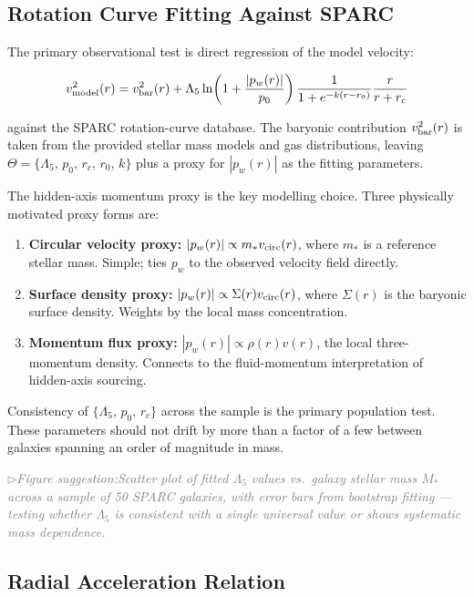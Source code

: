 \documentclass[11pt,a4paper]{article}
\newcommand{\pw}{p_w}                        %
\newcommand{\Lf}{\Lambda_5}                  %
\newcommand{\vbar}{v_{\rm bar}}              %
\newcommand{\vmod}{v_{\rm model}}            %
\newcommand{\figsuggest}[1]{%
  \medskip
  \noindent\hspace{0pt}\textcolor{gray}{\small\itshape
    $\triangleright$\;Figure suggestion:\enspace #1}%
  \medskip}
\begin{document}
\subsection{Rotation Curve Fitting Against SPARC}\label{sec:sparc}

The primary observational test is direct regression of the model velocity:

\[
  \vmod^2(r) = \vbar^2(r) + \Lf\ln\!\left(1+\frac{|\pw(r)|}{p_0}\right)
  \frac{1}{1+e^{-k(r-r_0)}} \frac{r}{r+r_c}
\]

against the SPARC rotation-curve database.  The baryonic contribution
$\vbar^2(r)$ is taken from the provided stellar mass models and gas
distributions, leaving $\Theta = \{\Lf,\,p_0,\,r_c,\,r_0,\,k\}$ plus a
proxy for $|\pw(r)|$ as the fitting parameters.

The hidden-axis momentum proxy is the key modelling choice.  Three
physically motivated proxy forms are:

\begin{enumerate}[leftmargin=1.5em]
  \item \textbf{Circular velocity proxy:} $|\pw(r)| \propto m_* v_{\rm circ}(r)$,
    where $m_*$ is a reference stellar mass.  Simple; ties $\pw$ to the
    observed velocity field directly.
  \item \textbf{Surface density proxy:} $|\pw(r)| \propto \Sigma(r) v_{\rm circ}(r)$,
    where $\Sigma(r)$ is the baryonic surface density.  Weights by the local
    mass concentration.
  \item \textbf{Momentum flux proxy:} $|\pw(r)| \propto \rho(r) v(r)$,
    the local three-momentum density.  Connects to the fluid-momentum
    interpretation of hidden-axis sourcing.
\end{enumerate}

Consistency of $\{\Lf,\,p_0,\,r_c\}$ across the sample is the primary
population test.  These parameters should not drift by more than a factor
of a few between galaxies spanning an order of magnitude in mass.

\figsuggest{Scatter plot of fitted $\Lf$ values vs.\ galaxy stellar mass
$M_*$ across a sample of 50 SPARC galaxies, with error bars from bootstrap
fitting --- testing whether $\Lf$ is consistent with a single universal value
or shows systematic mass dependence.}

\subsection{Radial Acceleration Relation}\label{sec:rar}
\end{document}
